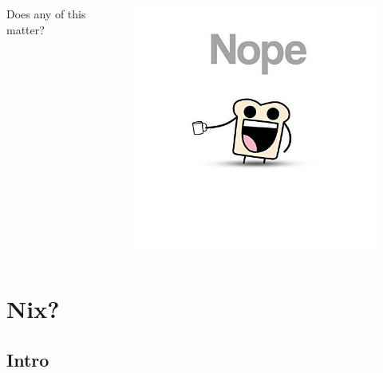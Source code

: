 \documentclass{beamer}
\begin{document}
\begin{frame}
    \begin{columns}
        \begin{column}{0.5\textwidth}
            Does any of this matter?
        \end{column}
        \begin{column}{0.5\textwidth}
            \begin{figure}
                \centering
                \includegraphics[width=\textwidth,keepaspectratio]{../resources/nope.jpg}
            \end{figure}
        \end{column}
    \end{columns}
\end{frame}

\section{Nix?}
\subsection{Intro}
\end{document}
